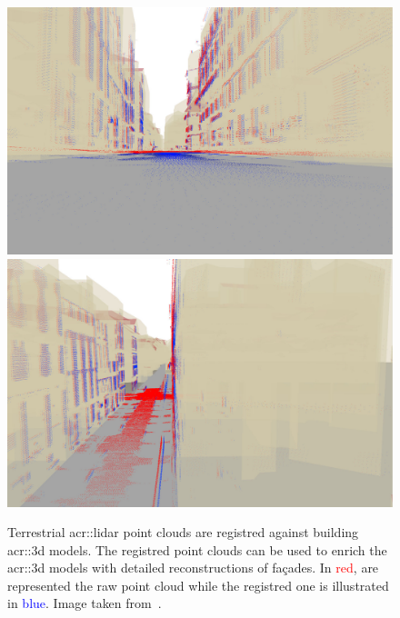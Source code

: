             \begin{figure}[htpb]
                \centering
                \includegraphics[width=.45\textwidth]{images/introduction/registration_1}
                \includegraphics[width=.45\textwidth]{images/introduction/registration_2}
                \caption[
                    Terrestrial \acrshort*{acr::lidar} point clouds are registred against building \acrshort*{acr::3d} models.
                ]{
                    \label{fig::3d_model_terrestrial_registration}
                    Terrestrial \gls{acr::lidar} point clouds are registred against building \gls{acr::3d} models.
                    The registred point clouds can be used to enrich the \gls{acr::3d} models with detailed reconstructions of fa\c{c}ades.
                    In \textcolor{Red}{red}, are represented the raw point cloud while the registred one is illustrated in \textcolor{Blue}{blue}.
                    Image taken from~\parencite{monnier2014}.
                }
            \end{figure}

